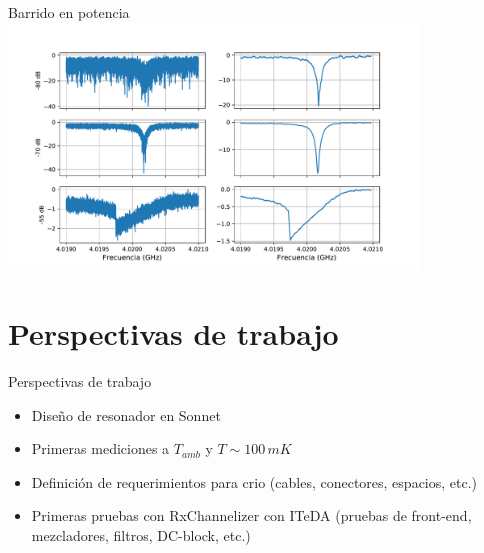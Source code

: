 \documentclass[ignorenonframetext,12pt]{beamer}
\begin{document}
\begin{frame}{Barrido en potencia}
				\centering
												\includegraphics[width=0.82\textwidth]{res0_3_potencias}

\end{frame}

\section{Perspectivas de trabajo}
\begin{frame}{Perspectivas de trabajo}
				\begin{itemize}
								\item Dise\~no de resonador en Sonnet
								\item Primeras mediciones a $T_{amb}$ y $T \sim 100\,mK$
								\item Definici\'on de requerimientos para crio (cables,
												conectores, espacios, etc.)
								\item Primeras pruebas con RxChannelizer con ITeDA (pruebas de
												front-end, mezcladores, filtros, DC-block, etc.)
				\end{itemize}
\end{frame}
\end{document}
